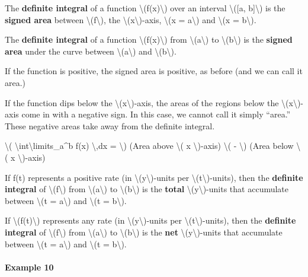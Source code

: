 The \textbf{definite integral} of a function
\textbackslash{}(f(x)\textbackslash{}) over an interval
\textbackslash{}({[}a, b{]}\textbackslash{}) is the \textbf{signed area}
between \textbackslash{}(f\textbackslash{}), the
\textbackslash{}(x\textbackslash{})-axis, \textbackslash{}(x =
a\textbackslash{}) and \textbackslash{}(x = b\textbackslash{}).

The \textbf{definite integral} of a function
\textbackslash{}(f(x)\textbackslash{}) from
\textbackslash{}(a\textbackslash{}) to
\textbackslash{}(b\textbackslash{}) is the \textbf{signed area} under
the curve between \textbackslash{}(a\textbackslash{}) and
\textbackslash{}(b\textbackslash{}).

If the function is positive, the signed area is positive, as before (and
we can call it area.)

If the function dips below the \textbackslash{}(x\textbackslash{})-axis,
the areas of the regions below the
\textbackslash{}(x\textbackslash{})-axis come in with a negative sign.
In this case, we cannot call it simply ``area.'' These negative areas
take away from the definite integral.

\textbackslash{}( \textbackslash{}int\textbackslash{}limits\_a\^{}b f(x)
\textbackslash{},dx = \textbackslash{}) (Area above \textbackslash{}( x
\textbackslash{})-axis) \textbackslash{}( - \textbackslash{}) (Area
below \textbackslash{}( x \textbackslash{})-axis)

If f(t) represents a positive rate (in
\textbackslash{}(y\textbackslash{})-units per
\textbackslash{}(t\textbackslash{})-units), then the \textbf{definite
integral} of \textbackslash{}(f\textbackslash{}) from
\textbackslash{}(a\textbackslash{}) to
\textbackslash{}(b\textbackslash{}) is the \textbf{total}
\textbackslash{}(y\textbackslash{})-units that accumulate between
\textbackslash{}(t = a\textbackslash{}) and \textbackslash{}(t =
b\textbackslash{}).

If \textbackslash{}(f(t)\textbackslash{}) represents any rate (in
\textbackslash{}(y\textbackslash{})-units per
\textbackslash{}(t\textbackslash{})-units), then the \textbf{definite
integral} of \textbackslash{}(f\textbackslash{}) from
\textbackslash{}(a\textbackslash{}) to
\textbackslash{}(b\textbackslash{}) is the \textbf{net}
\textbackslash{}(y\textbackslash{})-units that accumulate between
\textbackslash{}(t = a\textbackslash{}) and \textbackslash{}(t =
b\textbackslash{}).

\hypertarget{example-10}{%
\paragraph{Example 10}\label{example-10}}

